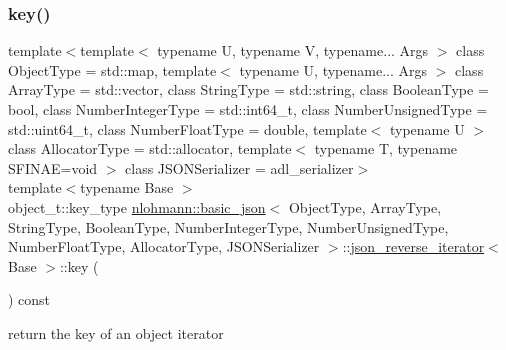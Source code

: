 \subsubsection{\texorpdfstring{key()}{key()}}
{\footnotesize\ttfamily template$<$template$<$ typename U, typename V, typename... Args $>$ class Object\+Type = std\+::map, template$<$ typename U, typename... Args $>$ class Array\+Type = std\+::vector, class String\+Type  = std\+::string, class Boolean\+Type  = bool, class Number\+Integer\+Type  = std\+::int64\+\_\+t, class Number\+Unsigned\+Type  = std\+::uint64\+\_\+t, class Number\+Float\+Type  = double, template$<$ typename U $>$ class Allocator\+Type = std\+::allocator, template$<$ typename T, typename S\+F\+I\+N\+A\+E=void $>$ class J\+S\+O\+N\+Serializer = adl\+\_\+serializer$>$ \\
template$<$typename Base $>$ \\
object\+\_\+t\+::key\+\_\+type \hyperlink{classnlohmann_1_1basic__json}{nlohmann\+::basic\+\_\+json}$<$ Object\+Type, Array\+Type, String\+Type, Boolean\+Type, Number\+Integer\+Type, Number\+Unsigned\+Type, Number\+Float\+Type, Allocator\+Type, J\+S\+O\+N\+Serializer $>$\+::\hyperlink{classnlohmann_1_1basic__json_1_1json__reverse__iterator}{json\+\_\+reverse\+\_\+iterator}$<$ Base $>$\+::key (\begin{DoxyParamCaption}{ }\end{DoxyParamCaption}) const\hspace{0.3cm}{\ttfamily [inline]}}



return the key of an object iterator 

\mbox{\label{classnlohmann_1_1basic__json_1_1json__reverse__iterator_a87a33e1b5bf42674ebe9c43ac41f8660}} 
